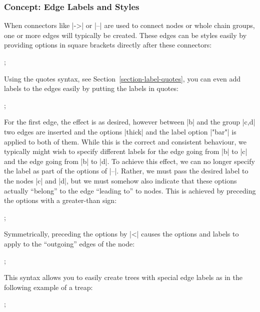 \subsubsection{Concept: Edge Labels and Styles}

When connectors like |->| or |--| are used to connect nodes or whole chain
groups, one or more edges will typically be created. These edges can be styles
easily by providing options in square brackets directly after these connectors:
%
\begin{codeexample}[preamble={\usetikzlibrary{graphs}}]
\tikz {};
\end{codeexample}

Using the quotes syntax, see Section~\ref{section-label-quotes}, you can even
add labels to the edges easily by putting the labels in quotes:
%
\begin{codeexample}[preamble={\usetikzlibrary{graphs,quotes}}]
\tikz {};
\end{codeexample}

For the first edge, the effect is as desired, however between |b| and the group
|{c,d}| two edges are inserted and the options |thick| and the label option
|"bar"| is applied to both of them. While this is the correct and consistent
behaviour, we typically might wish to specify different labels for the edge
going from |b| to |c| and the edge going from |b| to |d|. To achieve this
effect, we can no longer specify the label as part of the options of |--|.
Rather, we must pass the desired label to the nodes |c| and |d|, but we must
somehow also indicate that these options actually ``belong'' to the edge
``leading to'' to nodes. This is achieved by preceding the options with a
greater-than sign:
%
\begin{codeexample}[preamble={\usetikzlibrary{graphs,quotes}}]
\tikz {};
\end{codeexample}

Symmetrically, preceding the options by |<| causes the options and labels to
apply to the ``outgoing'' edges of the node:
%
\begin{codeexample}[preamble={\usetikzlibrary{graphs,quotes}}]
\tikz {};
\end{codeexample}

This syntax allows you to easily create trees with special edge labels as in
the following example of a treap:
%
\begin{codeexample}[preamble={\usetikzlibrary{graphs,quotes}}]
\tikz
  ;
\end{codeexample}


